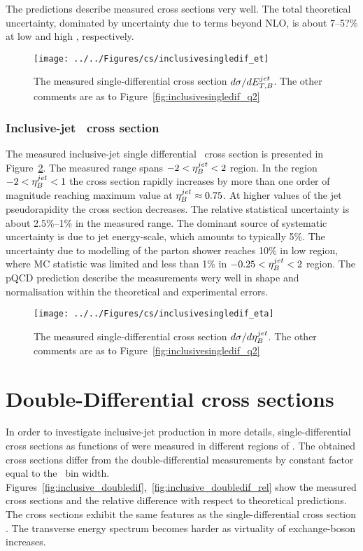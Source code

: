 The predictions describe measured cross sections very well. The total theoretical uncertainty, dominated by uncertainty due to terms beyond NLO, is about 7--5?\% at low and high \etjetb, respectively. 
\begin{figure}[p]
	\centering
		\texttt{[image: ../../Figures/cs/inclusivesingledif\_et]}
	\caption{The measured single-differential cross section $d\sigma/d\mbox{$E_{T,B}^{jet}$}$. The other comments are as to Figure~\ref{fig:inclusivesingledif_q2}}
	\label{fig:inclusivesingledif_et}
\end{figure}

\subsubsection*{Inclusive-jet \dsdetajetb~cross section}
The measured inclusive-jet single differential \dsdetajetb~cross section is presented in Figure~\ref{fig:inclusivesingledif_eta}. The measured range spans $-2 < \mbox{$\eta_B^{jet}$} < 2$ region. In the region  $-2 < \mbox{$\eta_B^{jet}$} < 1$ the cross section rapidly increases by more than one order of magnitude reaching maximum value at $\mbox{$\eta_B^{jet}$} \approx 0.75$. At higher values of the jet pseudorapidity the cross section decreases. The relative statistical uncertainty is about 2.5\%--1\% in the measured range. The dominant source of systematic uncertainty is due to jet energy-scale, which amounts to typically 5\%. The uncertainty due to modelling of the parton shower reaches 10\% in low \etajetb region, where MC statistic was limited and less than 1\% in $-0.25 < \mbox{$\eta_B^{jet}$} < 2$ region. The pQCD prediction describe the measurements wery well in shape and normalisation within the theoretical and experimental errors.
\begin{figure}[p]
	\centering
		\texttt{[image: ../../Figures/cs/inclusivesingledif\_eta]}
	\caption{The measured single-differential cross section $d\sigma/d\mbox{$\eta_B^{jet}$}$. The other comments are as to Figure~\ref{fig:inclusivesingledif_q2}}
	\label{fig:inclusivesingledif_eta}
\end{figure}

\section{Double-Differential cross sections}
In order to investigate inclusive-jet production in more details, single-differential cross sections as functions of \etjetb were measured in different regions of \qsq. The obtained cross sections differ from the double-differential measurements by constant factor equal to the \qsq~bin width. Figures~\ref{fig:inclusive_doubledif},~\ref{fig:inclusive_doubledif_rel} show the measured cross sections and the relative difference with respect to theoretical predictions. The cross sections exhibit the same features as the single-differential cross section \dsdetjetb. The transverse energy spectrum becomes harder as virtuality of exchange-boson increases.

